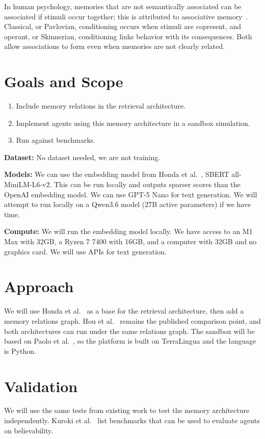 \documentclass[11pt]{article}
\begin{document}
In human psychology, memories that are not semantically associated can be associated if stimuli occur together; this is attributed to associative memory~\cite{apa}. Classical, or Pavlovian, conditioning occurs when stimuli are copresent, and operant, or Skinnerian, conditioning links behavior with its consequences. Both allow associations to form even when memories are not clearly related.

\section{Goals and Scope}
\begin{enumerate}
  \item Include memory relations in the retrieval architecture.
  \item Implement agents using this memory architecture in a sandbox simulation.
  \item Run against benchmarks.
\end{enumerate}

\textbf{Dataset:} No dataset needed, we are not training.

\textbf{Models:} We can use the embedding model from Honda et al.~\cite{honda2025}, SBERT all-MiniLM-L6-v2. This can be run locally and outputs sparser scores than the OpenAI embedding model. We can use GPT-5 Nano for text generation. We will attempt to run locally on a Qwen3.6 model (27B active parameters) if we have time.

\textbf{Compute:} We will run the embedding model locally. We have access to an M1 Max with 32GB, a Ryzen 7 7400 with 16GB, and a computer with 32GB and no graphics card. We will use APIs for text generation.

\section{Approach}
We will use Honda et al.~\cite{honda2025} as a base for the retrieval architecture, then add a memory relations graph. Hou et al.~\cite{hou2024} remains the published comparison point, and both architectures can run under the same relations graph. The sandbox will be based on Paolo et al.~\cite{paolo2026}, so the platform is built on TerraLingua and the language is Python.

\section{Validation}
We will use the same tests from existing work to test the memory architecture independently. Kuroki et al.~\cite{kuroki2026} list benchmarks that can be used to evaluate agents on believability.
\end{document}
